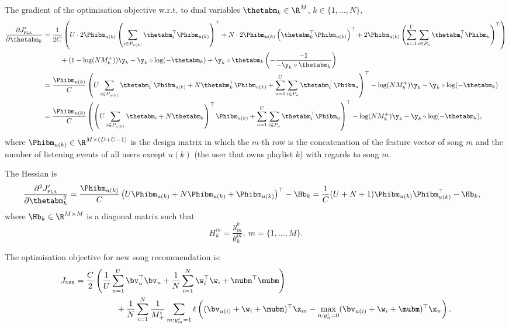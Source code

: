 The gradient of the optimisation objective w.r.t. to dual variables $\thetabm_k \in \R^{M}$, $k \in \{1,\dots,N\}$,
\begin{equation*}
\begin{aligned}
\frac{\partial J_\textsc{pla}'}{\partial \thetabm_k}
&= \frac{1}{2 C} \left( U \cdot 2 \Phibm_{u(k)} \left(\sum_{i \in P_{u(k)}} \thetabm_i^\top \Phibm_{u(k)} \right)^\top 
   + N \cdot 2 \Phibm_{u(k)} \left( \thetabm_k^\top \Phibm_{u(k)} \right)^\top
   + 2 \Phibm_{u(k)} \left(\sum_{u=1}^U \sum_{i \in P_u} \thetabm_i^\top \Phibm_u \right)^\top \right) \\
& \hspace{2.5em}
   + (1 - \log(N M_k^+)) \y_k - \y_k \circ \log(-\thetabm_k) + \y_k \circ \thetabm_k \left( -\frac{-1}{-\y_k \circ \thetabm_k} \right) \\
&= \frac{\Phibm_{u(k)}}{C} \left( U \sum_{i \in P_{u(k)}} \thetabm_i^\top \Phibm_{u(k)}
   + N \thetabm_k^\top \Phibm_{u(k)} 
   + \sum_{u=1}^U \sum_{i \in P_u} \thetabm_i^\top \Phibm_u \right)^\top
   - \log(N M_k^+) \y_k - \y_k \circ \log(-\thetabm_k) \\
&= \frac{\Phibm_{u(k)}}{C} \left( \left( U \sum_{i \in P_{u(k)}} \thetabm_i + N \thetabm_k \right)^\top \Phibm_{u(k)} 
   + \sum_{u=1}^U \sum_{i \in P_u} \thetabm_i^\top \Phibm_u \right)^\top
   - \log(N M_k^+) \y_k - \y_k \circ \log(-\thetabm_k),
\end{aligned}
\end{equation*}
where $\Phibm_{u(k)} \in \R^{M \times (D + U - 1)}$ is the design matrix in which 
the $m$-th row is the concatenation of the feature vector of song $m$ 
and the number of listening events of all users except $u(k)$ (the user that owns playlist $k$) with regards to song $m$.

The Hessian is
\begin{equation*}
\begin{aligned}
\frac{\partial^2 J_\textsc{pla}'}{\partial \thetabm_k^2}
&= \frac{\Phibm_{u(k)}}{C} \left( U \Phibm_{u(k)} + N \Phibm_{u(k)} + \Phibm_{u(k)} \right)^\top - \Hb_k
 = \frac{1}{C} (U + N + 1) \Phibm_{u(k)} \Phibm_{u(k)}^\top - \Hb_k,
\end{aligned}
\end{equation*}
where $\Hb_k \in \R^{M \times M}$ is a diagonal matrix such that
\begin{equation*}
H_k^m = \frac{y_m^k}{\theta_k^m}, \ m = \{1,\dots,M\}.
\end{equation*}


The optimisation objective for new song recommendation is:
\begin{equation}
\label{eq:primal_nsr}
\begin{aligned}
J_\textsc{nsr}
&= \frac{C}{2} \left( \frac{1}{U} \sum_{u=1}^U \bv_u^\top \bv_u 
     + \frac{1}{N} \sum_{i=1}^N \w_i^\top \w_i + \mubm^\top \mubm \right) \\
& \hspace{5em}
     + \frac{1}{N} \sum_{i=1}^N \frac{1}{M_+^i} \sum_{m: y_m^i = 1} \ell \left( (\bv_{u(i)} + \w_i + \mubm)^\top \x_m 
     - \max_{n: y_n^i = 0} (\bv_{u(i)} + \w_i + \mubm)^\top \x_n \right).
\end{aligned}
\end{equation}

